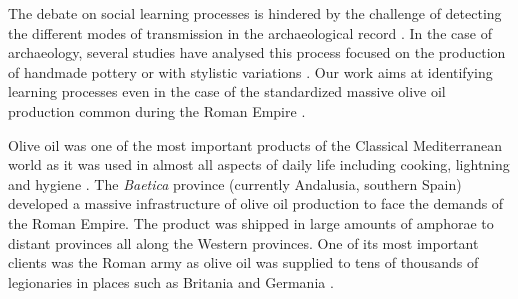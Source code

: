 \documentclass[review]{elsarticle}
\begin{document}

The debate on social learning processes is hindered by the challenge of detecting the different modes of transmission in the archaeological record \citep{roux_standardization_2015}. In the case of archaeology, several studies have analysed this process focused on the production of handmade pottery \citep{steele_james_ceramic_2010} or with stylistic variations \citep{neiman_stylistic_1995, shennan_ceramic_2001}. Our work aims at identifying learning processes even in the case of the standardized massive olive oil production common during the Roman Empire \citep{gandon_copying_2014,bevan_mediterranean_2014}. 

Olive oil was one of the most important products of the Classical Mediterranean world as it was used in almost all aspects of daily life including cooking, lightning and hygiene \citep{mattingly_d.j._oil_1988}. The \emph{Baetica} province (currently Andalusia, southern Spain) developed a massive infrastructure of olive oil production to face the demands of the Roman Empire. The product was shipped in large amounts of amphorae to distant provinces all along the Western provinces. One of its most important clients was the Roman army as olive oil was supplied to tens of thousands of legionaries in places such as Britania \citep{funari_economic_2005, monfort_britannia_1998} and Germania \citep{remesal_annona_1986}. 
\end{document}
